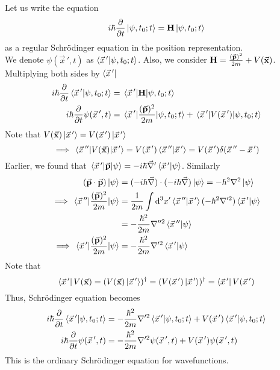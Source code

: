 \documentclass[12pt,a4paper,titlepage]{article}
\begin{document}
Let us write the equation
\begin{equation}
i\hbar\pdv{t}\ket{\psi,t_{0};t}=\vb{H}\ket{\psi,t_{0};t}
\end{equation}
as a regular Schr\"{o}dinger equation in the position representation.\\

We denote $\psi(\vec{x}\,',t)$ as $\ip{\vec{x}\,'}{\psi,t_{0};t}$. Also, we consider $\vb{H}=\frac{(\vec{\vb{p}})^{2}}{2m}+V(\vec{\vb{x}})$. Multiplying both sides by $\bra{\vec{x}\,'}$
\begin{equation}
\begin{aligned}
i\hbar\pdv{t}\ip{\vec{x}\,'}{\psi,t_{0};t}&=\mel{\vec{x}\,'}{\vb{H}}{\psi,t_{0};t}\\
i\hbar\pdv{t}\psi(\vec{x}\,',t)&=\mel{\vec{x}\,'}{\frac{(\vec{\vb{p}})^{2}}{2m}}{\psi,t_{0};t}+\mel{\vec{x}\,'}{V(\vec{x}\,')}{\psi,t_{0};t}
\end{aligned}
\end{equation}
Note that $V(\vec{\vb{x}})\ket{\vec{x}\,'}=V(\vec{x}\,')\ket{\vec{x}\,'}$
\begin{equation}
\implies \mel{\vec{x}\,''}{V(\vec{\vb{x}})}{\vec{x}\,'}=V(\vec{x}\,')\ip{\vec{x}\,''}{\vec{x}\,'}=V(\vec{x}\,')\delta(\vec{x}\,''-\vec{x}\,')
\end{equation}
Earlier, we found that $\mel{\vec{x}\,'}{\vec{\vb{p}}}{\psi}=-i\hbar\vec{\nabla}'\ip{\vec{x}\,'}{\psi}$. Similarly
\begin{equation}
\begin{aligned}
(\vec{\vb{p}}\cdot\vec{\vb{p}})\ket{\psi}&=(-i\hbar\vec{\nabla})\cdot(-i\hbar\vec{\nabla})\ket{\psi}=-\hbar^{2}\nabla^{2}\ket{\psi}\\
\implies\mel{\vec{x}\,''}{\frac{(\vec{\vb{p}})^{2}}{2m}}{\psi}&=\frac{1}{2m}\int\dd[3]{x'}\ip{\vec{x}\,''}{\vec{x}\,'}(-\hbar^{2}\nabla'^{2})\ip{\vec{x}\,'}{\psi}\\
&=-\frac{\hbar^{2}}{2m}\nabla''^{2}\ip{\vec{x}\,''}{\psi}\\
\implies\mel{\vec{x}\,'}{\frac{(\vec{\vb{p}})^{2}}{2m}}{\psi}&=-\frac{\hbar^{2}}{2m}\nabla'^{2}\ip{\vec{x}\,'}{\psi}
\end{aligned}
\end{equation}
Note that
\begin{equation}
\bra{\vec{x}\,'}V(\vec{\vb{x}})=(V(\vec{\vb{x}})\ket{\vec{x}\,'})^{\dagger}=(V(\vec{x}\,')\ket{\vec{x}\,'})^{\dagger}=\bra{\vec{x}\,'}V(\vec{x}\,')
\end{equation}
Thus, Schr\"{o}dinger equation becomes
\begin{equation}
\begin{aligned}
i\hbar\pdv{t}\ip{\vec{x}\,'}{\psi,t_{0};t}&=-\frac{\hbar^{2}}{2m}\nabla'^{2}\ip{\vec{x}\,'}{\psi,t_{0};t}+V(\vec{x}\,')\ip{\vec{x}\,'}{\psi,t_{0};t}\\
i\hbar\pdv{t}\psi(\vec{x}\,',t)&=-\frac{\hbar^{2}}{2m}\nabla'^{2}\psi(\vec{x}\,',t)+V(\vec{x}\,')\psi(\vec{x}\,',t)
\end{aligned}
\end{equation}
This is the ordinary Schr\"{o}dinger equation for wavefunctions.\\
\end{document}
